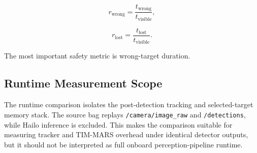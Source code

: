 \begin{equation}
r_\mathrm{wrong} = \frac{t_\mathrm{wrong}}{t_\mathrm{visible}},
\end{equation}

\begin{equation}
r_\mathrm{lost} = \frac{t_\mathrm{lost}}{t_\mathrm{visible}}.
\end{equation}

The most important safety metric is wrong-target duration.

\subsection{Runtime Measurement Scope}

The runtime comparison isolates the post-detection tracking and selected-target memory stack. The source bag replays \texttt{/camera/image\_raw} and \texttt{/detections}, while Hailo inference is excluded. This makes the comparison suitable for measuring tracker and TIM-MARS overhead under identical detector outputs, but it should not be interpreted as full onboard perception-pipeline runtime.

